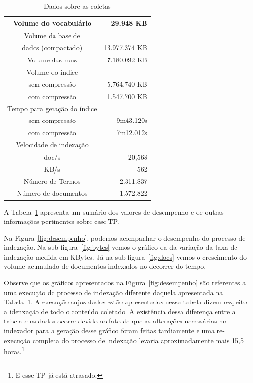 \documentclass[10pt,twocolumn]{article}
\begin{document}
\begin{table}[htbp]
\centering
\begin{tabular}{|c|r|} \hline
Volume do vocabulário&	      29.948 KB \\\hline
Volume da base de &   			\\
dados (compactado)&   	  13.977.374 KB \\\hline
Volume das runs  &	   7.180.092 KB \\\hline
Volume do índice  &			\\
  sem compressão  &	   5.764.740 KB \\
  com compressão  &	   1.547.700 KB \\\hline
Tempo para geração do índice  &		\\
  sem compressão  &	   9m43.120s \\
  com compressão  &	   7m12.012s \\\hline
Velocidade de indexação&		\\
  doc/s		  & 20,568		\\
  KB/s		& 562			\\\hline
Número de Termos&     2.311.837	\\\hline
Número de documentos& 1.572.822		\\\hline
\hline
\end{tabular}
\caption{Dados sobre as coletas}
\label{tab:sumario}
\end{table}


A Tabela~\ref{tab:sumario} apresenta um sumário dos valores de
desempenho e de outras informações pertinentes sobre esse TP.

Na Figura~\ref{fig:desempenho}, podemos acompanhar o desempenho do
processo de indexação. Na sub-figura~\ref{fig:bytes} vemos o gráfico da
da variação da taxa de indexação medida em KBytes. Já na
sub-figura~\ref{fig:docs} vemos o crescimento do volume acumulado de
documentos indexados no decorrer do tempo.



Observe que os gráficos apresentados na Figura~\ref{fig:desempenho} são
referentes a uma execução do processo de indexação diferente daquela
apresentada na Tabela~\ref{tab:sumario}. A execução cujos dados estão
apresentados nessa tabela dizem respeito a idenxação de todo o conteúdo
coletado. A existência dessa diferença entre a tabela e os dados ocorre
devido ao fato de que as alterações necessárias no indexador para a
geração desse gráfico foram feitas tardiamente e uma re-execução
completa do processo de indexação levaria aproximadamente mais 15,5
horas.\footnote{E esse TP já está atrasado.}
\end{document}

